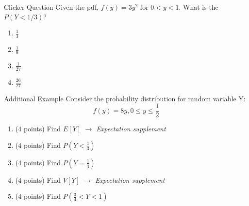 \documentclass{beamer}
\begin{document}
\begin{frame}{Clicker Question}
	Given the pdf, $f(y)=3y^2$ for $0<y<1$. What is the $P(Y<1/3)$?
		\begin{enumerate}[label=(\alph*)]
		\item $\frac{1}{3}$
		\item $\frac{1}{9}$
		\item $\frac{1}{27}$
		\item $\frac{26}{27}$
	\end{enumerate}
\end{frame}

\begin{frame}{Additional Example}
	Consider the probability distribution for random variable Y:
	\[ 
		f(y)= 8y, 0\leq y \leq \frac{1}{2} 
	\]

	\begin{enumerate}[label=(\alph*)]
		\item (4 points) Find $E[Y]$ \textit{$\rightarrow$ Expectation supplement}
		      
		\item (4 points) Find $P(Y<\frac{1}{3})$
		      		\item (4 points) Find $P(Y=\frac{1}{4})$
		      
		\item (4 points) Find $V[Y]$ \textit{$\rightarrow$ Expectation supplement}
		
		\item (4 points) Find $P(\frac{3}{4}<Y<1)$
	\end{enumerate}
\end{frame}
\end{document}
